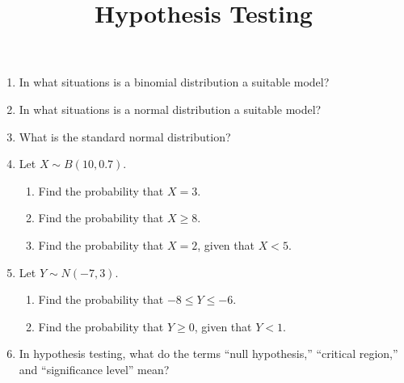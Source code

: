 \documentclass{article}
\begin{document}
\title{Hypothesis Testing}
\date{}

\maketitle
\thispagestyle{empty}

\Large

\begin{enumerate}
	\item In what situations is a binomial distribution a suitable model?
	\item In what situations is a normal distribution a suitable model?
	\item What is the standard normal distribution?
	\item Let $X\sim B(10,0.7)$.
		\begin{enumerate}
			\item Find the probability that $X=3$.
			\item Find the probability that $X\geq 8$.
			\item Find the probability that $X=2$, given that $X<5$.
		\end{enumerate}
	\item Let $Y\sim N(-7,3)$.
		\begin{enumerate}
			\item Find the probability that $-8\leq Y \leq -6$.
			\item Find the probability that $Y\geq 0$, given that $Y<1$.
		\end{enumerate}
	\item In hypothesis testing, what do the terms ``null hypothesis,'' ``critical region,'' and ``significance level'' mean?
\end{enumerate}



\clearpage
\end{document}
